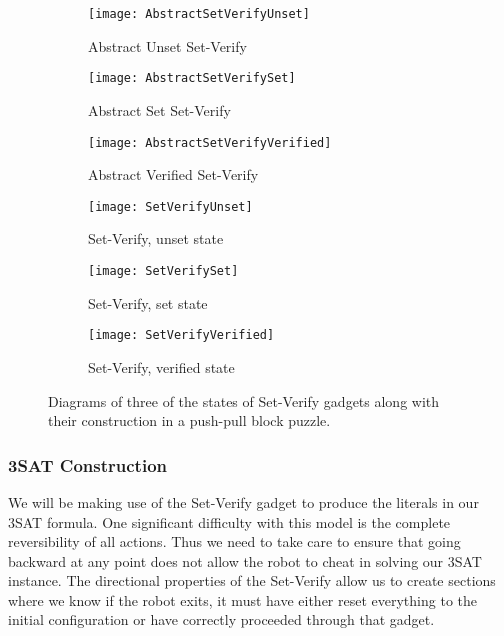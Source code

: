 \begin{figure}[!ht]
  \centering
    \begin{subfigure}[b]{0.3\textwidth}
    \texttt{[image: AbstractSetVerifyUnset]}
    \caption{Abstract Unset Set-Verify}
    \vspace{15pt}
    \end{subfigure}
    \hfill
    \begin{subfigure}[b]{0.3\textwidth}
    \texttt{[image: AbstractSetVerifySet]}
    \caption{Abstract Set Set-Verify}
    \vspace{15pt}
    \end{subfigure}
    \hfill
    \begin{subfigure}[b]{0.3\textwidth}
    \texttt{[image: AbstractSetVerifyVerified]}
    \caption{Abstract Verified Set-Verify}
    \vspace{15pt}
  \end{subfigure}  
   \vspace{10pt}
  \begin{subfigure}[b]{0.3\textwidth}
    \texttt{[image: SetVerifyUnset]}
    \caption{Set-Verify, unset state}
    \label{SetVerifyUnset}
  \end{subfigure}
  \hfill
  \begin{subfigure}[b]{0.3\textwidth}
    \texttt{[image: SetVerifySet]}
    \caption{Set-Verify, set state}
    \label{SetVerifySet}
  \end{subfigure}
  \hfill
  \begin{subfigure}[b]{0.3\textwidth}
    \texttt{[image: SetVerifyVerified]}
    \caption{Set-Verify, verified state}
    \label{SetVerifyVerified}
  \end{subfigure}
  \caption{Diagrams of three of the states of Set-Verify gadgets along with their construction in a push-pull block puzzle.}
  \label{setVerifyDiagrams}
\end{figure}


\subsubsection{3SAT Construction}
\label{sec:2DPushPull3SAT}

We will be making use of the Set-Verify gadget to produce the literals in our 3SAT formula. One significant difficulty with this model is the complete reversibility of all actions. Thus we need to take care to ensure that going backward at any point does not allow the robot to cheat in solving our 3SAT instance. The directional properties of the Set-Verify allow us to create sections where we know if the robot exits, it must have either reset everything to the initial configuration or have correctly proceeded through that gadget.

